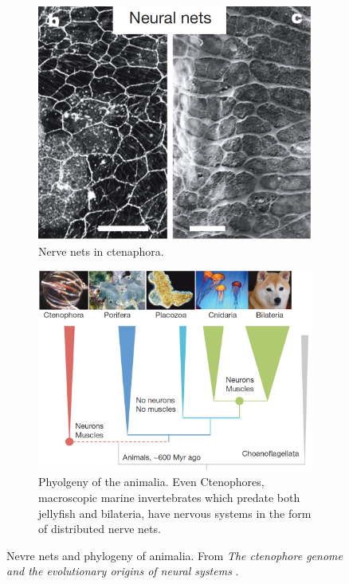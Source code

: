 \begin{figure}
	\centering
	\begin{subfigure}[t]{0.30\textwidth}
		\includegraphics[width=\textwidth]{Figs/neuralNet.png}
		\caption{Nerve nets in ctenaphora.}
		\label{fig:nerveNets}
	\end{subfigure}
	\begin{subfigure}[t]{0.65\textwidth}
		\includegraphics[width=\textwidth]{Figs/animalia3.png}
		\caption{Phyolgeny of the animalia. Even Ctenophores, macroscopic marine invertebrates which predate both jellyfish and bilateria, have nervous systems in the form of distributed nerve nets.}
		\label{fig:animalia2}
	\end{subfigure}
	\caption{Nevre nets and phylogeny of animalia. From {\em {T}he ctenophore genome and the evolutionary origins of neural systems} \cite[p. 100]{animalia2}.}
\end{figure}

